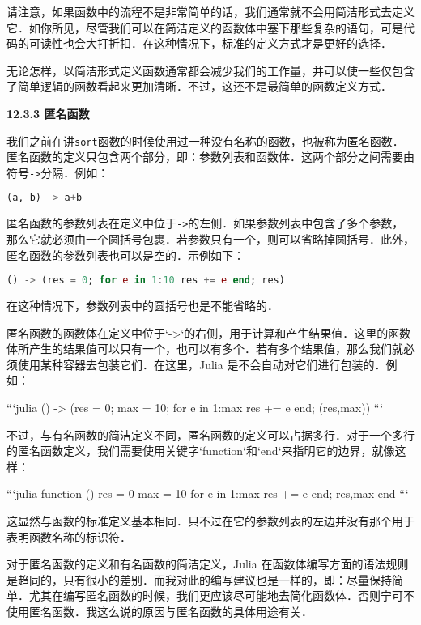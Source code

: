 请注意，如果函数中的流程不是非常简单的话，我们通常就不会用简洁形式去定义它．如你所见，尽管我们可以在简洁定义的函数体中塞下那些复杂的语句，可是代码的可读性也会大打折扣．在这种情况下，标准的定义方式才是更好的选择．

无论怎样，以简洁形式定义函数通常都会减少我们的工作量，并可以使一些仅包含了简单逻辑的函数看起来更加清晰．不过，这还不是最简单的函数定义方式．

\textbf{12.3.3 匿名函数}

我们之前在讲\verb|sort|函数的时候使用过一种没有名称的函数，也被称为匿名函数．匿名函数的定义只包含两个部分，即：参数列表和函数体．这两个部分之间需要由符号\verb|->|分隔．例如：

\begin{lstlisting}[language=julia]
(a, b) -> a+b
\end{lstlisting}

匿名函数的参数列表在定义中位于\verb|->|的左侧．如果参数列表中包含了多个参数，那么它就必须由一个圆括号包裹．若参数只有一个，则可以省略掉圆括号．此外，匿名函数的参数列表也可以是空的．示例如下：

\begin{lstlisting}[language=julia]
() -> (res = 0; for e in 1:10 res += e end; res)
\end{lstlisting}

在这种情况下，参数列表中的圆括号也是不能省略的．

匿名函数的函数体在定义中位于`->`的右侧，用于计算和产生结果值．这里的函数体所产生的结果值可以只有一个，也可以有多个．若有多个结果值，那么我们就必须使用某种容器去包装它们．在这里，Julia 是不会自动对它们进行包装的．例如：

```julia
() -> (res = 0; max = 10; for e in 1:max res += e end; (res,max))
```

不过，与有名函数的简洁定义不同，匿名函数的定义可以占据多行．对于一个多行的匿名函数定义，我们需要使用关键字`function`‌和`end`来指明它的边界，就像这样：

```julia
function ()
    res = 0
    max = 10
    for e in 1:max res += e end;
    res,max
end
```

这显然与函数的标准定义基本相同．只不过在它的参数列表的左边并没有那个用于表明函数名称的标识符．

对于匿名函数的定义和有名函数的简洁定义，Julia 在函数体编写方面的语法规则是趋同的，只有很小的差别．而我对此的编写建议也是一样的，即：尽量保持简单．尤其在编写匿名函数的时候，我们更应该尽可能地去简化函数体．否则宁可不使用匿名函数．我这么说的原因与匿名函数的具体用途有关．

